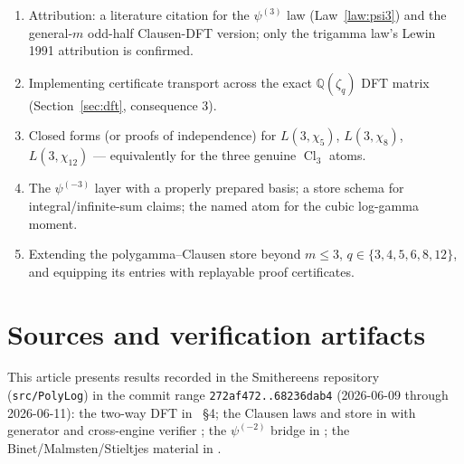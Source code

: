 \documentclass[11pt]{article}
\theoremstyle{remark}
\newcommand{\Cl}{\operatorname{Cl}}
\begin{document}
\begin{enumerate}
\item Attribution: a literature citation for the $\psi^{(3)}$ law (Law~\ref{law:psi3})
and the general-$m$ odd-half Clausen-DFT version; only the trigamma law's Lewin 1991
attribution is confirmed.
\item Implementing certificate transport across the exact $\mathbb{Q}(\zeta_q)$ DFT
matrix (Section~\ref{sec:dft}, consequence 3).
\item Closed forms (or proofs of independence) for $L(3,\chi_5)$, $L(3,\chi_8)$,
$L(3,\chi_{12})$ --- equivalently for the three genuine $\Cl_3$ atoms.
\item The $\psi^{(-3)}$ layer with a properly prepared basis; a store schema for
integral/infinite-sum claims; the named atom for the cubic log-gamma moment.
\item Extending the polygamma--Clausen store beyond $m\le3$, $q\in\{3,4,5,6,8,12\}$, and
equipping its entries with replayable proof certificates.
\end{enumerate}

\section*{Sources and verification artifacts}

This article presents results recorded in the Smithereens repository
(\texttt{src/PolyLog}) in the commit range \texttt{272af472..68236dab4} (2026-06-09
through 2026-06-11): the two-way DFT in ~\S4; the Clausen
laws and store in  with generator
 and cross-engine verifier
; the $\psi^{(-2)}$ bridge in
; the
Binet/Malmsten/Stieltjes material in
.
\end{document}
